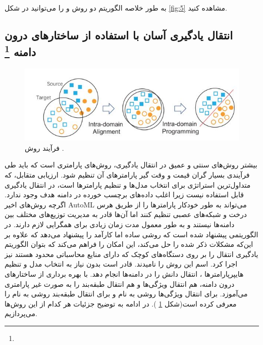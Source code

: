 {{{	 	به طور خلاصه الگوریتم دو روش 
	 	و
	 	را می‌توانید در شکل
	 	\ref{fig:5}
	 	 مشاهده کنید.
	 		
	 	}
	}

	\subsection{انتقال یادگیری آسان با استفاده از ساختارهای درون دامنه
		\protect \footnote{}}
	{
		\begin{figure}
			\centering
			\includegraphics[scale=0.6]{images/easyTL.JPG}
			\caption{ فرآیند روش 
				\cite{wang2019easy}.
			}
			\label{fig:6}
		\end{figure}
		بیشتر روش‌های سنتی و عمیق در انتقال یادگیری، روش‌های پارامتری است که باید طی فرآیندی بسیار گران قیمت و وقت گیر پارامترهای آن تنظیم شود. ارزیابی متقابل، که متداول‌ترین استراتژی برای انتخاب مدل‌ها و تنظیم پارامترها است، در انتقال یادگیری قابل استفاده نیست زیرا اغلب داده‌های برچسب خورده در دامنه هدف وجود ندارد. اگرچه روش‌های اخیر AutoML می‌تواند به طور خودکار پارامترها را از طریق هرس درخت و شبکه‌های عصبی تنظیم کنند اما آن‌ها قادر به مدیریت توزیع‌های مختلف بین دامنه‌ها نیستند و به طور معمول مدت زمان زیادی برای همگرایی لازم دارند. در 
		\cite{wang2019easy}
		الگوریتمی پیشنهاد شده است که روشی ساده اما کارآمد را پیشنهاد می‌دهد که علاوه بر این‌که مشکلات ذکر شده را حل می‌کند، این امکان را فراهم می‌کند که بتوان الگوریتم یادگیری انتقال را بر روی دستگاه‌های کوچک که دارای منایع محاسباتی محدود هستند نیز اجرا کرد. اسم این روش را
		نامیدند.
		قادر است بدون نیاز به انتخاب مدل و تنظیم هایپرپارامترها ، انتقال دانش را در دامنه‌ها انجام دهد.
		با بهره برداری از ساختارهای درون دامنه، هم انتقال ویژگی‌ها و هم انتقال طبقه‌بند را به صورت غیر پارامتری می‌آموزد. برای انتقال ویژگی‌ها روشی به نام
		و برای انتقال طبقه‌بند روشی به نام
		را معرفی کرده است(شکل 
		\ref{fig:6}
		). در ادامه به توضیح جزئیات هر کدام از این روش‌ها می‌پردازیم.
		
}}
